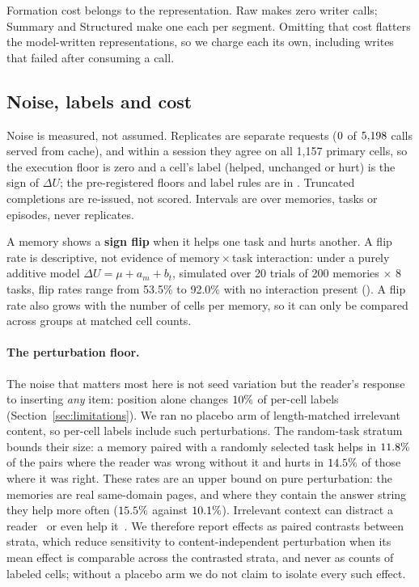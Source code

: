 Formation cost belongs to the representation. Raw makes zero writer calls;
Summary and Structured make one each per segment. Omitting that cost flatters
the model-written representations, so we charge each its own, including
writes that failed after consuming a call.

\subsection{Noise, labels and cost}
\label{sec:metrics}
Noise is measured, not assumed. Replicates are separate requests
($0$ of $5{,}198$ calls served from cache), and within a
session they agree on all 1{,}157 primary cells, so the execution floor is zero
and a cell's label (helped, unchanged or hurt) is the sign of $\Delta U$; the pre-registered floors and
label rules are in . Truncated completions are re-issued, not
scored. Intervals are over memories, tasks or episodes, never replicates.

A memory shows a \textbf{sign flip} when it helps one task and hurts another. A flip rate is descriptive, not evidence of
memory\,$\times$\,task interaction: under a purely additive model
$\Delta U = \mu + a_m + b_t$, simulated over 20 trials of 200 memories
$\times$ 8 tasks, flip rates range from 53.5\% to 92.0\% with no interaction
present (). A flip rate also grows with the number of cells
per memory, so it can only be compared across groups at matched cell counts.

\paragraph{The perturbation floor.}
The noise that matters most here is not seed variation but the reader's
response to inserting \emph{any} item: position alone changes
$10\%$ of per-cell labels (Section~\ref{sec:limitations}). We ran no placebo arm of length-matched irrelevant content,
so per-cell labels include such perturbations. The random-task stratum bounds their size: a memory paired with a randomly
selected task helps in $11.8\%$ of the pairs where the reader was
wrong without it and hurts in $14.5\%$ of those where it was right.
These rates are an upper bound on pure perturbation: the memories are real
same-domain pages, and where they contain the answer string they help more
often ($15.5\%$ against $10.1\%$). Irrelevant
context can distract a reader~\cite{distracted} or even help it~\cite{powernoise}. We therefore report effects as paired contrasts between strata, which reduce
sensitivity to content-independent perturbation when its mean effect is
comparable across the contrasted strata, and never as counts of labeled cells;
without a placebo arm we do not claim to isolate every such effect.

